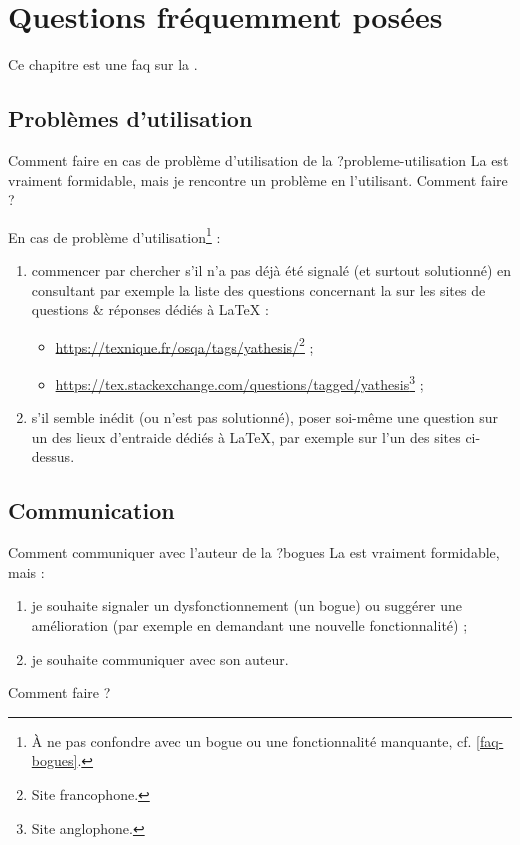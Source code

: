 \chapter{Questions fréquemment posées}\label{cha-faq}

Ce chapitre est une \gls{faq}  sur la \yatCl{}.

\section{Problèmes d'utilisation}

\begin{dbfaq}{Comment faire en cas de problème d'utilisation de la \yatCl{} ?}{probleme-utilisation}
  La \yatCl{} est vraiment formidable, mais je rencontre un problème en
  l'utilisant.  Comment faire ?
\end{dbfaq}

En cas de problème d'utilisation\footnote{À ne pas confondre avec un bogue ou
  une fonctionnalité manquante, cf. \vref{faq-bogues}.} :
\begin{enumerate}
\item commencer par chercher s'il n'a pas déjà été signalé (et surtout
  solutionné) en consultant par exemple la liste des questions concernant la
  \yatCl{} sur les sites de questions \& réponses dédiés à \LaTeX{} :
  \begin{itemize}
  \item \url{https://texnique.fr/osqa/tags/yathesis/}\footnote{Site
      francophone.} ;
  \item
    \url{https://tex.stackexchange.com/questions/tagged/yathesis}\footnote{Site
      anglophone.} ;
  \end{itemize}
\item s'il semble inédit (ou n'est pas  solutionné), poser
  soi-même une question sur un des lieux d'entraide dédiés à \LaTeX{}, par
  exemple sur l'un des sites ci-dessus\ecm{}.
\end{enumerate}

\section{Communication}
\label{sec-communication}

\begin{dbfaq}{Comment communiquer avec l'auteur de la \yatCl{} ?}{bogues}
  La \yatCl{} est vraiment formidable, mais :
  \begin{enumerate}
  \item je souhaite signaler un dysfonctionnement (un bogue) ou suggérer une
    amélioration (par exemple en demandant une nouvelle fonctionnalité) ;
  \item je souhaite communiquer avec son auteur.
  \end{enumerate}
  Comment faire ?
\end{dbfaq}

